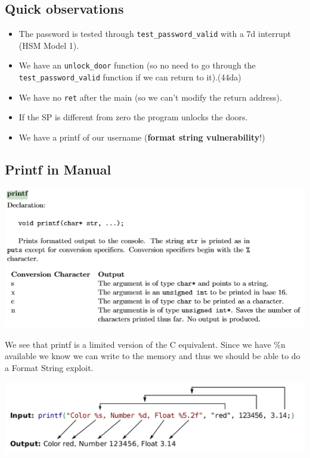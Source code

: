 \documentclass[a4paper,11pt]{article}
\begin{document}
\subsection{Quick observations}\label{quick-observations}

\begin{itemize}
\itemsep1pt\parskip0pt
\item
  The password is tested through \texttt{test\_password\_valid} with a
  7d interrupt (HSM Model 1).
\item
  We have an \texttt{unlock\_door} function (so no need to go through
  the \texttt{test\_password\_valid} function if we can return to
  it).(44da)
\item
  We have no \texttt{ret} after the main (so we can't modify the return
  address).
\item
  If the SP is different from zero the program unlocks the doors.
\item
  We have a printf of our username (\textbf{format string
  vulnerability}!)
\end{itemize}

\subsection{Printf in Manual}\label{printf-in-manual}

\includegraphics{img/12_2.PNG}

We see that printf is a limited version of the C equivalent. Since we
have \%n available we know we can write to the memory and thus we should
be able to do a Format String exploit.

\includegraphics{img/12_3.PNG}
\end{document}
